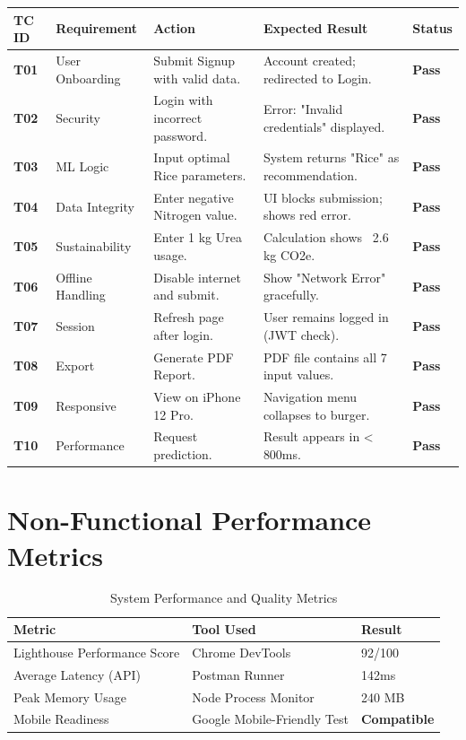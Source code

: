 \documentclass[12pt,a4paper]{report}
\begin{document}
\begin{longtable}{|p{1.2cm}|p{3.5cm}|p{3cm}|p{3.5cm}|p{1.5cm}|}
    \hline
    \textbf{TC ID} & \textbf{Requirement} & \textbf{Action} & \textbf{Expected Result} & \textbf{Status} \\
    \hline
    \endhead
    
    \textbf{T01} & User Onboarding & Submit Signup with valid data. & Account created; redirected to Login. & \textbf{Pass} \\
    \hline
    \textbf{T02} & Security & Login with incorrect password. & Error: "Invalid credentials" displayed. & \textbf{Pass} \\
    \hline
    \textbf{T03} & ML Logic & Input optimal Rice parameters. & System returns "Rice" as recommendation. & \textbf{Pass} \\
    \hline
    \textbf{T04} & Data Integrity & Enter negative Nitrogen value. & UI blocks submission; shows red error. & \textbf{Pass} \\
    \hline
    \textbf{T05} & Sustainability & Enter 1 kg Urea usage. & Calculation shows ~2.6 kg CO2e. & \textbf{Pass} \\
    \hline
    \textbf{T06} & Offline Handling & Disable internet and submit. & Show "Network Error" gracefully. & \textbf{Pass} \\
    \hline
    \textbf{T07} & Session & Refresh page after login. & User remains logged in (JWT check). & \textbf{Pass} \\
    \hline
    \textbf{T08} & Export & Generate PDF Report. & PDF file contains all 7 input values. & \textbf{Pass} \\
    \hline
    \textbf{T09} & Responsive & View on iPhone 12 Pro. & Navigation menu collapses to burger. & \textbf{Pass} \\
    \hline
    \textbf{T10} & Performance & Request prediction. & Result appears in < 800ms. & \textbf{Pass} \\
    \hline
\end{longtable}

\section{Non-Functional Performance Metrics}
\begin{table}[H]
    \centering
    \begin{tabularx}{\textwidth}{|l|X|l|}
        \hline
        \textbf{Metric} & \textbf{Tool Used} & \textbf{Result} \\
        \hline
        Lighthouse Performance Score & Chrome DevTools & 92/100 \\
        \hline
        Average Latency (API) & Postman Runner & 142ms \\
        \hline
        Peak Memory Usage & Node Process Monitor & 240 MB \\
        \hline
        Mobile Readiness & Google Mobile-Friendly Test & \textbf{Compatible} \\
        \hline
    \end{tabularx}
    \caption{System Performance and Quality Metrics}
\end{table}
\end{document}

